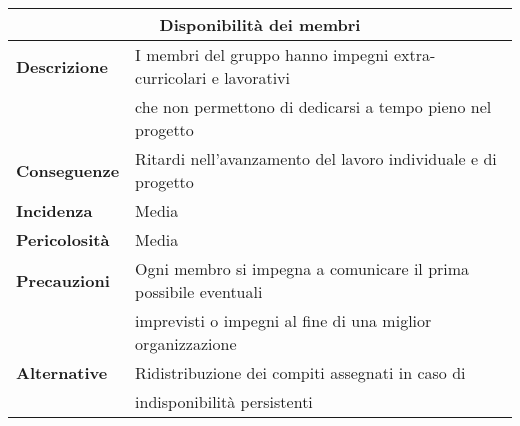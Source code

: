 \begin{center}
    \begin{tabularx}{0.8\linewidth}{l|l}
        \multicolumn{2}{c}{\textbf{Disponibilità dei membri}}                                                   \\
        \hline{\textbf{Descrizione}}    & I membri del gruppo hanno impegni extra-curricolari e lavorativi      \\
                                        & che non permettono di dedicarsi a tempo pieno nel progetto            \\
        \textbf{Conseguenze}            & Ritardi nell'avanzamento del lavoro individuale e di progetto         \\
        \textbf{Incidenza}              & Media                                                                 \\
        \textbf{Pericolosità}           & Media                                                                 \\
        \textbf{Precauzioni}            & Ogni membro si impegna a comunicare il prima possibile eventuali      \\ 
                                        & imprevisti o impegni al fine di una miglior organizzazione            \\
        \textbf{Alternative}            & Ridistribuzione dei compiti assegnati in caso di                      \\ 
                                        & indisponibilità persistenti                                           \\ 
    \end{tabularx}
\end{center}

